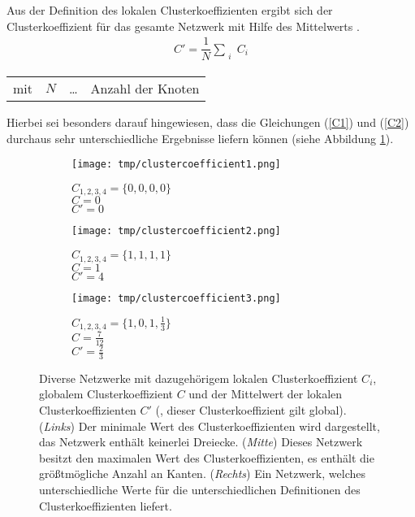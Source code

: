 \documentclass[a4paper,10pt]{scrbook}
\begin{document}
Aus der Definition des lokalen Clusterkoeffizienten ergibt sich der Clusterkoeffizient für das gesamte Netzwerk mit Hilfe des Mittelwerts \cite{Newman}.
\begin{align}
C' = \dfrac{1}{N} \sum_{\substack{i}} C_{i}
\label{C2}
\end{align}
\begin{table}[H]
\begin{tabular}{rccl}
mit  & $N$ & \ldots & Anzahl der Knoten\\
\end{tabular}
\end{table}
Hierbei sei besonders darauf hingewiesen, dass die Gleichungen (\ref{C1}) und (\ref{C2}) durchaus sehr unterschiedliche Ergebnisse liefern können (siehe Abbildung \ref{Abb15}).
\begin{figure}[H]
\centering
	\begin{minipage}[t]{0.3\textwidth}
		\begin{figure}[H]
		\texttt{[image: tmp/clustercoefficient1.png]}
		\caption*{$C_{1,2,3,4}=\lbrace 0,0,0,0\rbrace$\\ $C=0$ \\ $C'=0$}
		\end{figure}
	\end{minipage}
	\begin{minipage}[t]{0.3\textwidth}
		\begin{figure}[H]
		\texttt{[image: tmp/clustercoefficient2.png]}
		\caption*{$C_{1,2,3,4}=\lbrace 1,1,1,1\rbrace$\\ $C=1$ \\ $C'=4$}
		\end{figure}
	\end{minipage}
	\begin{minipage}[t]{0.3\textwidth}
		\begin{figure}[H]
		\texttt{[image: tmp/clustercoefficient3.png]}
		\caption*{$C_{1,2,3,4}=\lbrace 1,0,1,\frac{1}{3}\rbrace$\\ $C=\frac{7}{12}$ \\ $C'=\frac{2}{3}$}
		\end{figure}
	\end{minipage}
	\caption{Diverse Netzwerke mit dazugehörigem lokalen Clusterkoeffizient $C_{i}$, globalem Clusterkoeffizient $C$ und der Mittelwert der lokalen Clusterkoeffizienten $C'$ (, dieser Clusterkoeffizient gilt global). (\textit{Links}) Der minimale Wert des Clusterkoeffizienten wird dargestellt, das Netzwerk enthält keinerlei Dreiecke. (\textit{Mitte}) Dieses Netzwerk besitzt den maximalen Wert des Clusterkoeffizienten, es enthält die größtmögliche Anzahl an Kanten. (\textit{Rechts}) Ein Netzwerk, welches unterschiedliche Werte für die unterschiedlichen Definitionen des Clusterkoeffizienten liefert.}
\label{Abb15}
\end{figure}
\end{document}
